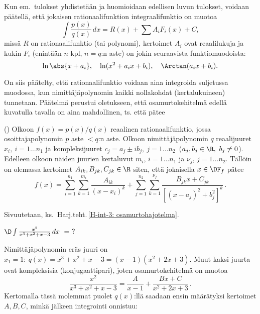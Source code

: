 Kun em.\ tulokset yhdistetään ja huomioidaan edellisen luvun tulokset, voidaan päätellä, että
jokaisen rationaalifunktion integraalifunktio on muotoa
\[
\int \frac{p(x)}{q(x)}\, dx=R(x)+\sum A_iF_i(x)+C,
\]
missä $R$ on rationaalifunktio (tai polynomi), kertoimet $A_i$ ovat reaalilukuja ja kukin
$F_i$ (enintään $n$ kpl, $n=q$:n aste) on jokin seuraavista funktiomuodoista:
\[
\ln\abs{x+a_i},\quad\ln(x^2+a_ix+b_i),\quad\Arctan(a_ix+b_i).
\]

On siis päätelty, että rationaalifunktio voidaan aina integroida suljetussa muodossa, kun
nimittäjäpolynomin kaikki nollakohdat (kertalukuineen) tunnetaan. Päätelmä perustui
oletukseen, että osamurtokehitelmä edellä kuvatulla tavalla on aina mahdollinen, ts. että
pätee
\begin{Lause} () \label{osamurtolause}
Olkoon $f(x)=p(x)/q(x)$ reaalinen rationaalifunktio, jossa osoittajapolynomin $p$ aste
$<q$:n aste. Olkoon nimittäjäpolynomin $q$ reaalijuuret $x_i,\ i=1 \ldots n_1$ ja
kompleksijuuret $c_j=a_j \pm ib_j,\ j=1 \ldots n_2\,$ ($a_j,b_j\in\R,\ b_j \neq 0$). Edelleen
olkoon näiden juurien kertaluvut $m_i$, $i=1 \ldots n_1$ ja $\nu_j$, $j=1 \ldots n_2$.
Tällöin on olemassa kertoimet $A_{ik},B_{jk},C_{jk}\in\R$ siten, että jokaisella $x\in\DF_f$
pätee
\[
f(x) = \sum_{i=1}^{n_1}\sum_{k=1}^{m_i} \frac{A_{ik}}{(x-x_i)^k}
     + \sum_{j=1}^{n_2}\sum_{k=1}^{\nu_j} \frac{B_{jk}x+C_{jk}}{[(x-a_j)^2+b_j^2]^k}\,.
\]
\end{Lause}
\tod Sivuutetaan, ks.\ Harj.teht.\,\ref{H-int-3: osamurtohajotelma}.
\begin{Exa}
$\D\int\frac{x^2}{x^3+x^2+x-3}\, dx\ =\ ?$
\end{Exa}
\ratk Nimittäjäpolynomin eräs juuri on $x_1=1:\ q(x)=x^3+x^2+x-3=(x-1)(x^2+2x+3)$. Muut kaksi
juurta ovat kompleksisia (konjugaattipari), joten osamurtokehitelmä on muotoa
\[
\frac{x^2}{x^3+x^2+x-3}=\frac{A}{x-1}+\frac{Bx+C}{x^2+2x+3}\,.
\]
Kertomalla tässä molemmat puolet $q(x)$:llä saadaan ensin määrätyksi kertoimet $A,B,C$, minkä
jälkeen integrointi onnistuu:
